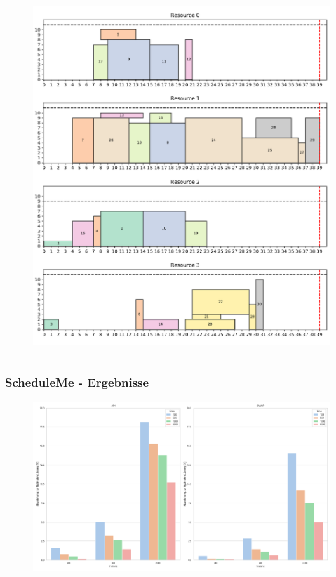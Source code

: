 \documentclass[aspectratio=169]{beamer}
\begin{document}
\begin{frame}
\begin{columns}[c]
		\begin{figure}
			\centering
			\includegraphics[scale=0.25]{example_plot_sa_swap.pdf}
		\end{figure}	
		
	\end{columns}
\end{frame}


\begin{frame}[t]
	\frametitle{ScheduleMe - Ergebnisse}
	\vspace{-10pt}
	\begin{figure}
		\centering
		\includegraphics[scale=0.25]{result1.pdf}
	\end{figure}	
\end{frame}
\end{document}
